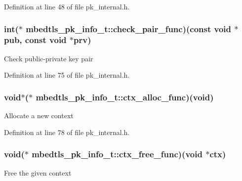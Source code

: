 Definition at line 48 of file pk\-\_\-internal.\-h.

\hypertarget{structmbedtls__pk__info__t_ab3b1ab920fa03e0f4698d45a50978d75}{
\subsubsection[{check\-\_\-pair\-\_\-func}]{\setlength{\rightskip}{0pt plus 5cm}int($\ast$ mbedtls\-\_\-pk\-\_\-info\-\_\-t\-::check\-\_\-pair\-\_\-func)(const void $\ast$pub, const void $\ast$prv)}}\label{structmbedtls__pk__info__t_ab3b1ab920fa03e0f4698d45a50978d75}
Check public-\/private key pair 

Definition at line 75 of file pk\-\_\-internal.\-h.

\hypertarget{structmbedtls__pk__info__t_a05d4488be20910fb48a835ba9753bbbe}{
\subsubsection[{ctx\-\_\-alloc\-\_\-func}]{\setlength{\rightskip}{0pt plus 5cm}void$\ast$($\ast$ mbedtls\-\_\-pk\-\_\-info\-\_\-t\-::ctx\-\_\-alloc\-\_\-func)(void)}}\label{structmbedtls__pk__info__t_a05d4488be20910fb48a835ba9753bbbe}
Allocate a new context 

Definition at line 78 of file pk\-\_\-internal.\-h.

\hypertarget{structmbedtls__pk__info__t_a3e5e57d7c65e78d461d294dbed3dda76}{
\subsubsection[{ctx\-\_\-free\-\_\-func}]{\setlength{\rightskip}{0pt plus 5cm}void($\ast$ mbedtls\-\_\-pk\-\_\-info\-\_\-t\-::ctx\-\_\-free\-\_\-func)(void $\ast$ctx)}}\label{structmbedtls__pk__info__t_a3e5e57d7c65e78d461d294dbed3dda76}
Free the given context 

